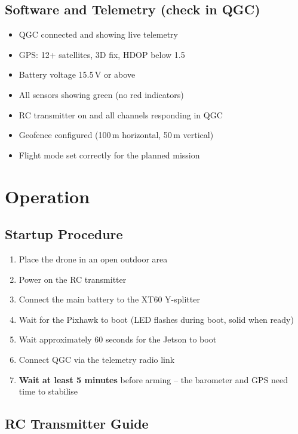 \documentclass{article}
\begin{document}
\subsection*{Software and Telemetry (check in QGC)}
\begin{itemize}
    \item[$\square$] QGC connected and showing live telemetry
    \item[$\square$] GPS: 12+ satellites, 3D fix, HDOP below 1.5
    \item[$\square$] Battery voltage 15.5\,V or above
    \item[$\square$] All sensors showing green (no red indicators)
    \item[$\square$] RC transmitter on and all channels responding in QGC
    \item[$\square$] Geofence configured (100\,m horizontal, 50\,m vertical)
    \item[$\square$] Flight mode set correctly for the planned mission
\end{itemize}

\section{Operation}

\subsection{Startup Procedure}

\begin{enumerate}
    \item Place the drone in an open outdoor area
    \item Power on the RC transmitter
    \item Connect the main battery to the XT60 Y-splitter
    \item Wait for the Pixhawk to boot (LED flashes during boot, solid when ready)
    \item Wait approximately 60 seconds for the Jetson to boot
    \item Connect QGC via the telemetry radio link
    \item \textbf{Wait at least 5 minutes} before arming -- the barometer and GPS need time to stabilise
\end{enumerate}

\subsection{RC Transmitter Guide}
\end{document}
